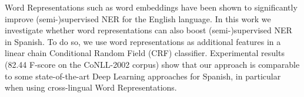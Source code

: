 Word Representations such as word embeddings have been shown to significantly improve (semi-)supervised NER for the English language. In this work we investigate whether word representations can also boost (semi-)supervised NER in Spanish. To do so, we use word representations as additional features in a linear chain Conditional Random Field (CRF) classifier. Experimental results (82.44 F-score on the CoNLL-2002 corpus) show that our approach is comparable to some state-of-the-art Deep Learning approaches for Spanish, in particular when using cross-lingual Word Representations.
